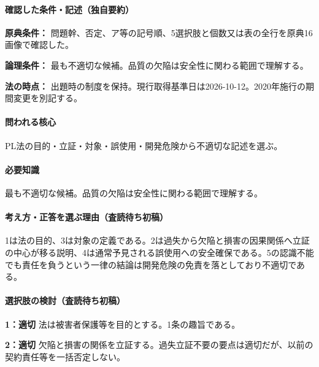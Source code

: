\paragraph{確認した条件・記述（独自要約）}\mbox{}\par

\noindent\textbf{原典条件：} 問題幹、否定、ア等の記号順、5選択肢と個数又は表の全行を原典16画像で確認した。\par

\noindent\textbf{論理条件：} 最も不適切な候補。品質の欠陥は安全性に関わる範囲で理解する。\par

\noindent\textbf{法の時点：} 出題時の制度を保持。現行取得基準日は2026-10-12。2020年施行の期間変更を別記する。\par

\paragraph{問われる核心} PL法の目的・立証・対象・誤使用・開発危険から不適切な記述を選ぶ。

\paragraph{必要知識} 最も不適切な候補。品質の欠陥は安全性に関わる範囲で理解する。

\paragraph{考え方・正答を選ぶ理由（査読待ち初稿）} 1は法の目的、3は対象の定義である。2は過失から欠陥と損害の因果関係へ立証の中心が移る説明、4は通常予見される誤使用への安全確保である。5の認識不能でも責任を負うという一律の結論は開発危険の免責を落としており不適切である。

\paragraph{選択肢の検討（査読待ち初稿）}\mbox{}\par

\noindent\textbf{1：適切} 法は被害者保護等を目的とする。1条の趣旨である。\par

\noindent\textbf{2：適切} 欠陥と損害の関係を立証する。過失立証不要の要点は適切だが、以前の契約責任等を一括否定しない。\par

